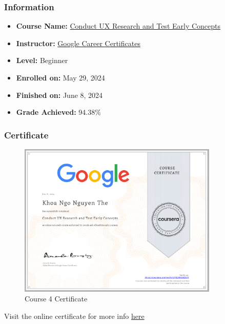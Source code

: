 \subsubsection{Information}
\begin{itemize}
	\item \textbf{Course Name:} \href{https://www.coursera.org/learn/conduct-ux-research}{Conduct UX Research and Test Early Concepts}
	\item \textbf{Instructor:} \href{https://www.coursera.org/instructor/google-career-certificates}{Google Career Certificates}
	\item \textbf{Level:} Beginner
	\item \textbf{Enrolled on:} May 29, 2024
	\item \textbf{Finished on:} June 8, 2024
	\item \textbf{Grade Achieved:} 94.38\%
\end{itemize}

\subsubsection{Certificate}
\begin{flushleft}
	\begin{figure}[!ht]
		\centering
		\includegraphics[width=0.85\textwidth]{imgs/Course4.png}
		\caption{Course 4 Certificate}
	\end{figure}

	Visit the online certificate for more info \href{https://www.coursera.org/account/accomplishments/verify/UYR29HCKGUF7}{here}
\end{flushleft}

